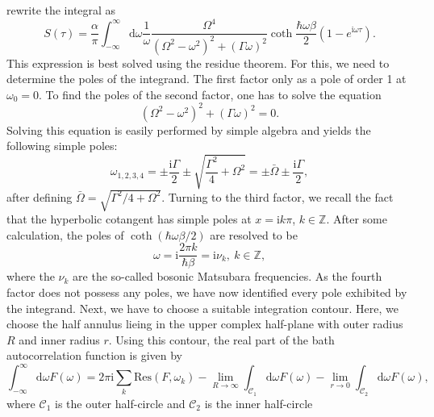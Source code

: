 rewrite the integral as 
%
\begin{equation}
    S \left( \tau \right) = \frac{\alpha}{\pi} 
    \int_{-\infty}^{\infty} \text{d}\omega \frac{1}{\omega} \frac{\Omega^4}{\left(\Omega^2-\omega^2\right)^2
    + \left(\Gamma\omega\right)^2}
    \coth\frac{\hbar\omega\beta}{2} \left( 1-e^{\text{i}\omega\tau} \right).
\end{equation}
%
This expression is best solved using the residue theorem. For this, we need to determine
the poles of the integrand. The first factor only as a pole of order 1 at $\omega_0 = 0$.
To find the poles of the second factor, one has to solve the equation
%
\begin{equation}
    \left(\Omega^2-\omega^2\right)^2
    + \left(\Gamma\omega\right)^2 = 0 .
\end{equation}
%
Solving this equation is easily performed by simple algebra and yields the following simple poles:
%
\begin{equation}
    \omega_{1,2,3,4} = \pm \frac{\text{i} \Gamma}{2} \pm \sqrt{\frac{\Gamma^2}{4} + \Omega^2}
    = \pm \bar{\Omega} \pm \frac{\text{i} \Gamma}{2},
\end{equation}
%
after defining $\bar{\Omega} = \sqrt{\Gamma^2/4 + \Omega^2}$.
Turning to the third factor, we recall the fact that the hyperbolic cotangent has simple poles
at $x = \text{i} k \pi$, $k \in \mathbb{Z}$. After some calculation, the poles of $\coth\left(\hbar\omega\beta / 2\right)$
are resolved to be
%
\begin{equation}
    \omega = \text{i} \frac{2\pi k}{\hbar\beta} = \text{i} \nu_k, \ k \in \mathbb{Z},
\end{equation}
%
where the $\nu_k$ are the so-called bosonic Matsubara frequencies. As the fourth factor 
does not possess any poles, we have now identified every pole exhibited by the integrand.
Next, we have to choose a suitable integration contour. Here, we choose the half annulus lieing
in the upper complex half-plane with outer radius $R$ and inner radius $r$.
Using this contour, the real part of the bath autocorrelation function is given by
%
\begin{equation}
    \int_{-\infty}^{\infty} \text{d}\omega F(\omega) = 2\pi\text{i}\sum_{k} \text{Res}(F,\omega_k)
    -\lim_{R\rightarrow\infty} \int_{\mathcal{C}_1}\text{d}\omega F(\omega)
    -\lim_{r\rightarrow 0} \int_{\mathcal{C}_2}\text{d}\omega F(\omega),
\end{equation}
%
where $\mathcal{C}_1$ is the outer half-circle and $\mathcal{C}_2$ is the inner half-circle
